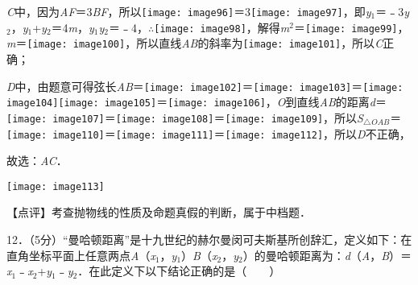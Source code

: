 \documentclass[a4paper,11pt,UTF8,twoside]{ctexart} %
\begin{document}
\textit{C}中，因为{\textbar}\textit{AF}{\textbar}＝3{\textbar}\textit{BF}{\textbar}，所以\texttt{[image: image96]}＝3\texttt{[image: image97]}，即\textit{y}${}_{1}$＝﹣3\textit{y}${}_{2}$，\textit{y}${}_{1}$+\textit{y}${}_{2}$＝4\textit{m}，\textit{y}${}_{1}$\textit{y}${}_{2}$＝﹣4，$\mathrm{\therefore}$\texttt{[image: image98]}，解得\textit{m}${}^{2}$＝\texttt{[image: image99]}，\textit{m}＝\texttt{[image: image100]}，所以直线\textit{AB}的斜率为\texttt{[image: image101]}，所以\textit{C}正确；

\textit{D}中，由题意可得弦长{\textbar}\textit{AB}{\textbar}＝\texttt{[image: image102]}＝\texttt{[image: image103]}＝\texttt{[image: image104]}\texttt{[image: image105]}＝\texttt{[image: image106]}，\textit{O}到直线\textit{AB}的距离\textit{d}＝\texttt{[image: image107]}＝\texttt{[image: image108]}＝\texttt{[image: image109]}，所以\textit{S}${}_{\triangle }$\textit{${}_{OAB}$}＝\texttt{[image: image110]}＝\texttt{[image: image111]}＝\texttt{[image: image112]}，所以\textit{D}不正确，

故选：\textit{AC}．

\texttt{[image: image113]}

【点评】考查抛物线的性质及命题真假的判断，属于中档题．

12．（5分）``曼哈顿距离''是十九世纪的赫尔曼闵可夫斯基所创辞汇，定义如下：在直角坐标平面上任意两点\textit{A}（\textit{x}${}_{1}$，\textit{y}${}_{1}$）\textit{B}（\textit{x}${}_{2}$，\textit{y}${}_{2}$）的曼哈顿距离为：\textit{d}（\textit{A}，\textit{B}）＝{\textbar}\textit{x}${}_{1}$﹣\textit{x}${}_{2}${\textbar}+{\textbar}\textit{y}${}_{1}$﹣\textit{y}${}_{2}${\textbar}．在此定义下以下结论正确的是（　　）
\end{document}

